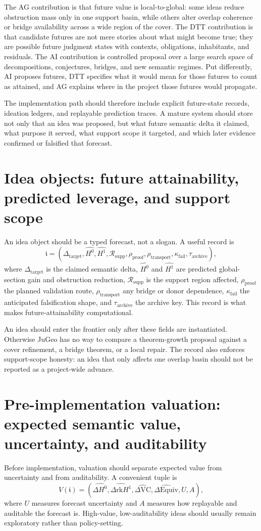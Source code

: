 \documentclass[11pt]{report}
\begin{document}
The AG contribution is that future value is local-to-global: some ideas reduce obstruction mass only in one support basin, while others alter overlap coherence or bridge availability across a wide region of the cover. The DTT contribution is that candidate futures are not mere stories about what might become true; they are possible future judgment states with contexts, obligations, inhabitants, and residuals. The AI contribution is controlled proposal over a large search space of decompositions, conjectures, bridges, and new semantic regimes. Put differently, AI proposes futures, DTT specifies what it would mean for those futures to count as attained, and AG explains where in the project those futures would propagate.

The implementation path should therefore include explicit future-state records, ideation ledgers, and replayable prediction traces. A mature system should store not only that an idea was proposed, but what future semantic delta it claimed, what purpose it served, what support scope it targeted, and which later evidence confirmed or falsified that forecast.
\section{Idea objects: future attainability, predicted leverage, and support scope}
An idea object should be a typed forecast, not a slogan. A useful record is
\[
\mathfrak{i} = (\Delta_{\mathrm{target}}, \widehat{H^0}, \widehat{H^1}, \mathcal{R}_{\mathrm{supp}}, \rho_{\mathrm{proof}}, \rho_{\mathrm{transport}}, \kappa_{\mathrm{fail}}, \tau_{\mathrm{archive}}),
\]
where $\Delta_{\mathrm{target}}$ is the claimed semantic delta, $\widehat{H^0}$ and $\widehat{H^1}$ are predicted global-section gain and obstruction reduction, $\mathcal{R}_{\mathrm{supp}}$ is the support region affected, $\rho_{\mathrm{proof}}$ the planned validation route, $\rho_{\mathrm{transport}}$ any bridge or donor dependence, $\kappa_{\mathrm{fail}}$ the anticipated falsification shape, and $\tau_{\mathrm{archive}}$ the archive key. This record is what makes future-attainability computational.

An idea should enter the frontier only after these fields are instantiated. Otherwise JuGeo has no way to compare a theorem-growth proposal against a cover refinement, a bridge theorem, or a local repair. The record also enforces support-scope honesty: an idea that only affects one overlap basin should not be reported as a project-wide advance.

\section{Pre-implementation valuation: expected semantic value, uncertainty, and auditability}
Before implementation, valuation should separate expected value from uncertainty and from auditability. A convenient tuple is
\[
V(\mathfrak{i}) = (\widehat{\Delta H^0}, \widehat{\Delta \mathrm{rk}H^1}, \widehat{\Delta \mathrm{VC}}, \widehat{\Delta \mathrm{Equiv}}, U, A),
\]
where $U$ measures forecast uncertainty and $A$ measures how replayable and auditable the forecast is. High-value, low-auditability ideas should usually remain exploratory rather than policy-setting.
\end{document}
